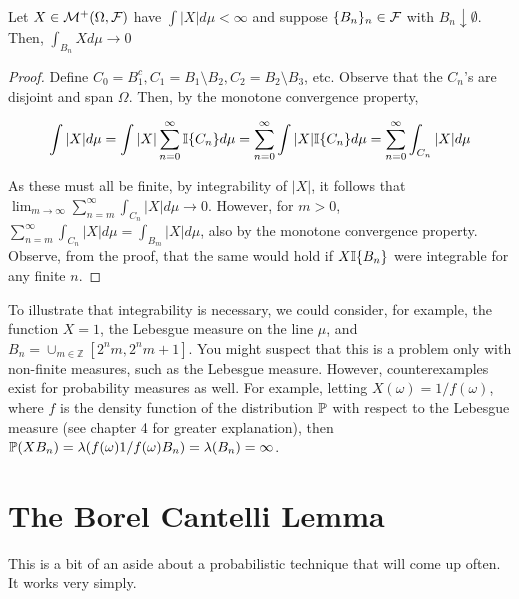         \begin{theorem} 
            Let $X \in \mathcal M^+(\Omega, \mathcal F)$ have $\int |X|d\mu < \infty$ and suppose $\{B_n\}_n \in \mathcal F$ with 
            $B_n \downarrow \emptyset$. Then, $\int_{B_n}X d\mu  \to 0$
        \end{theorem}
        
        \begin{proof}
            Define $C_0 = B_1^c, C_1 = B_1 \setminus B_2, C_2 = B_2 \setminus B_3$, etc. Observe that 
            the $C_n$'s are disjoint and span $\Omega$. Then, by the monotone convergence property,

            \[ \int |X| d\mu = \int |X| \sum_{n=0}^\infty \mathbb I\{C_n\}d\mu =  \sum_{n=0}^\infty \int |X|\mathbb I\{C_n\}d\mu =  \sum_{n=0}^\infty \int_{C_n} |X| d\mu \]
            
            As these must all be finite, by integrability of $|X|$, it follows that 
            $\lim_{m \to \infty} \sum_{n=m}^\infty \int_{C_n} |X| d\mu \to 0$. However, 
            for $m > 0$, $\sum_{n=m}^\infty \int_{C_n} |X| d\mu = \int_{B_m} |X|d\mu$, also by the 
            monotone convergence property. Observe, from the proof, that the same would hold if 
            $X\mathbb I\{B_n\}$ were integrable for any finite $n$.

        \end{proof}

        To illustrate that integrability is necessary, we could consider, for example, the function 
        $X = 1$, the Lebesgue measure on the line $\mu$, and $B_n = \cup_{m \in \mathbb Z}[2^n m, 2^n m + 1]$. 
        You might suspect that this is a problem only with non-finite measures, such as the Lebesgue measure. 
        However, counterexamples exist for probability measures as well. For example, letting 
        $X(\omega) = 1/f(\omega)$, where $f$ is the density function of the distribution $\mathbb P$ with respect to 
        the Lebesgue measure (see chapter 4 for greater explanation), then $\mathbb P(X B_n) = \lambda(f(\omega)1/f(\omega)B_n) = \lambda(B_n) = \infty$.
    

    \section{The Borel Cantelli Lemma}

    This is a bit of an aside about a probabilistic technique that will come up often. It works very simply. 

